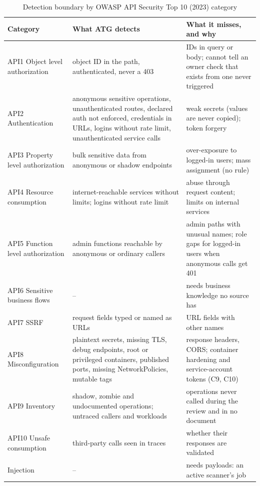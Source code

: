 \documentclass[conference]{IEEEtran}
\begin{document}
\begin{table}[t]
\caption{Detection boundary by OWASP API Security Top 10 (2023) category}
\label{tab:limits}
\centering
\footnotesize
\begin{tabular}{@{}p{3.6cm}p{6.2cm}p{6.9cm}@{}}
\toprule
Category & What ATG detects & What it misses, and why \\
\midrule
API1 Object level authorization & object ID in the path, authenticated, never a 403 & IDs in query or body; cannot tell an owner check that exists from one never triggered \\
API2 Authentication & anonymous sensitive operations, unauthenticated routes, declared auth not enforced, credentials in URLs, logins without rate limit, unauthenticated service calls & weak secrets (values are never copied); token forgery \\
API3 Property level authorization & bulk sensitive data from anonymous or shadow endpoints & over-exposure to logged-in users; mass assignment (no rule) \\
API4 Resource consumption & internet-reachable services without limits; logins without rate limit & abuse through request content; limits on internal services \\
API5 Function level authorization & admin functions reachable by anonymous or ordinary callers & admin paths with unusual names; role gaps for logged-in users when anonymous calls get 401 \\
API6 Sensitive business flows & -- & needs business knowledge no source has \\
API7 SSRF & request fields typed or named as URLs & URL fields with other names \\
API8 Misconfiguration & plaintext secrets, missing TLS, debug endpoints, root or privileged containers, published ports, missing NetworkPolicies, mutable tags & response headers, CORS; container hardening and service-account tokens (C9, C10) \\
API9 Inventory & shadow, zombie and undocumented operations; untraced callers and workloads & operations never called during the review and in no document \\
API10 Unsafe consumption & third-party calls seen in traces & whether their responses are validated \\
Injection & -- & needs payloads: an active scanner's job \\
\bottomrule
\end{tabular}
\end{table}
\end{document}
